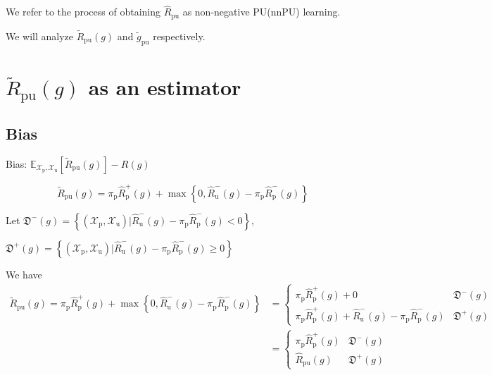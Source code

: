 \documentclass[12pt]{article}
\theoremstyle{definition}
\begin{document}
 We refer to the process of obtaining $\widehat{R}_{\mathrm{pu}}$ as non-negative PU(nnPU) learning.
 
 We will analyze $\widetilde{R}_{\mathrm{pu}}(g)$ and $\widetilde{g}_{\mathrm{pu}}$ respectively.
 
 \section{$\widetilde{R}_{\mathrm{pu}}(g)$ as an estimator}
 
 \subsection{Bias}
 Bias: $\mathbb{E}_{\mathcal{X}_{\mathrm{p}}, \mathcal{X}_{\mathrm{u}}}\left[\widetilde{R}_{\mathrm{pu}}(g)\right]-R(g)$
 
 \begin{equation*}
 	 \widetilde{R}_{\mathrm{pu}}(g)=\pi_{\mathrm{p}} \widehat{R}_{\mathrm{p}}^{+}(g)+\max \left\{0, \widehat{R}_{\mathrm{u}}^{-}(g)-\pi_{\mathrm{p}} \widehat{R}_{\mathrm{p}}^{-}(g)\right\}
 \end{equation*}
 
 Let $\mathfrak{D}^{-}(g)=\left\{\left(\mathcal{X}_{\mathrm{p}}, \mathcal{X}_{\mathrm{u}}\right) | \widehat{R}_{\mathrm{u}}^{-}(g)-\pi_{\mathrm{p}} \hat{R}_{\mathrm{p}}^{-}(g)<0\right\}$, 
 
 $\mathfrak{D}^{+}(g)=\left\{\left(\mathcal{X}_{\mathrm{p}}, \mathcal{X}_{\mathrm{u}}\right) | \widehat{R}_{\mathrm{u}}^{-}(g)-\pi_{\mathrm{p}} \hat{R}_{\mathrm{p}}^{-}(g)\ge 0\right\}$
 
 We have
 \begin{equation*}
 	\begin{aligned}
 		 \widetilde{R}_{\mathrm{pu}}(g)=
 		\pi_{\mathrm{p}} \widehat{R}_{\mathrm{p}}^{+}(g)+\max \left\{0, \widehat{R}_{\mathrm{u}}^{-}(g)-\pi_{\mathrm{p}} \widehat{R}_{\mathrm{p}}^{-}(g)\right\}
 		&=
 		\begin{cases} 
 		\pi_{\mathrm{p}} \widehat{R}_{\mathrm{p}}^{+}(g) +0 & \mathfrak{D}^{-}(g) \\
 		\pi_{\mathrm{p}} \widehat{R}_{\mathrm{p}}^{+}(g)+\widehat{R}_{\mathrm{u}}^{-}(g)-\pi_{\mathrm{p}} \widehat{R}_{\mathrm{p}}^{-}(g)  & \mathfrak{D}^{+}(g) 
 		\end{cases}\\
 		 &= \begin{cases} 
 		\pi_{\mathrm{p}} \widehat{R}_{\mathrm{p}}^{+}(g) & \mathfrak{D}^{-}(g) \\
 		\widehat{R}_{\mathrm{pu}}(g)& \mathfrak{D}^{+}(g) 
 		\end{cases}
 	\end{aligned}
 \end{equation*}
 
\end{document}

